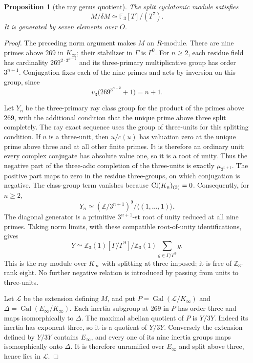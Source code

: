 \documentclass[11pt]{article}
\newtheorem{proposition}[theorem]{Proposition}
\theoremstyle{remark}\newtheorem{remark}[theorem]{Remark}
\newcommand{\Z}{\mathbb Z}\newcommand{\Q}{\mathbb Q}\newcommand{\F}{\mathbb F}
\newcommand{\Gal}{\operatorname{Gal}}\newcommand{\len}{\operatorname{length}}
\begin{document}
\begin{proposition}[the ray genus quotient]
\label{prop:raygenus}
The split cyclotomic module satisfies
\[
 M/\delta M\simeq\F_3[T]/(T^7).
\]
It is generated by seven elements over $O$.
\end{proposition}
\begin{proof}
The preceding norm argument makes $M$ an $R$-module.
There are nine primes above $269$ in $K_\infty$; their stabilizer in $\Gamma$ is $\Gamma^9$.
For $n\geq2$, each residue field has cardinality $269^{2\cdot3^{n-2}}$ and its three-primary multiplicative group has order $3^{n+1}$.
Conjugation fixes each of the nine primes and acts by inversion on this group, since
\[
 v_3\bigl(269^{3^{n-2}}+1\bigr)=n+1.
\]

Let $Y_n$ be the three-primary ray class group for the product of the primes above $269$, with the additional condition that the unique prime above three split completely.
The ray exact sequence \citep[Chapter V, Section 1]{Milne2020} uses the group of three-units for this splitting condition.
If $u$ is a three-unit, then $u/c(u)$ has valuation zero at the unique prime above three and at all other finite primes.
It is therefore an ordinary unit; every complex conjugate has absolute value one, so it is a root of unity.
Thus the negative part of the three-adic completion of the three-units is exactly $\mu_{3^{n+1}}$.
The positive part maps to zero in the residue three-groups, on which conjugation is negative.
The class-group term vanishes because $\operatorname{Cl}(K_n)_{(3)}=0$.
Consequently, for $n\geq2$,
\[
 Y_n\simeq(\Z/3^{n+1})^9/\langle(1,\ldots,1)\rangle.
\]
The diagonal generator is a primitive $3^{n+1}$-st root of unity reduced at all nine primes.
Taking norm limits, with these compatible root-of-unity identifications, gives
\begin{equation}
 Y\simeq
 \Z_3(1)[\Gamma/\Gamma^9]\big/
 \Z_3(1)\sum_{g\in\Gamma/\Gamma^9}g.
 \label{eq:raymodule}
\end{equation}
This is the ray module over $K_\infty$ with splitting at three imposed; it is free of $\Z_3$-rank eight.
No further negative relation is introduced by passing from units to three-units.

Let $\mathcal L$ be the extension defining $M$, and put
$P=\Gal(\mathcal L/K_\infty)$ and $\Delta=\Gal(E_\infty/K_\infty)$.
Each inertia subgroup at $269$ in $P$ has order three and maps isomorphically to $\Delta$.
The maximal abelian quotient of $P$ is $Y/3Y$.
Indeed its inertia has exponent three, so it is a quotient of $Y/3Y$.
Conversely the extension defined by $Y/3Y$ contains $E_\infty$, and every one of its nine inertia groups maps isomorphically onto $\Delta$.
It is therefore unramified over $E_\infty$ and split above three, hence lies in $\mathcal L$.


\end{proof}
\end{document}
